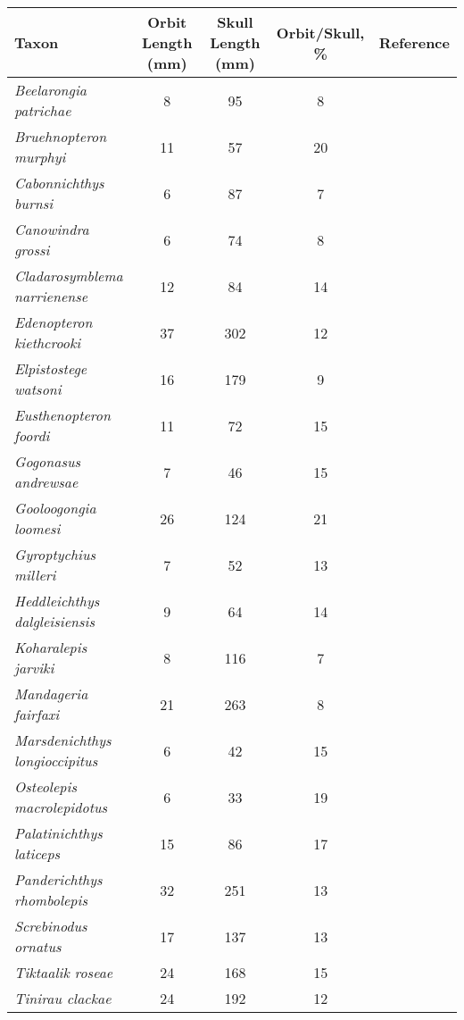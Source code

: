 \begin{tabular}{|L{4.5cm}|c|c|c|L{4.5cm}|}
\hline
\textbf{Taxon}&\textbf{Orbit Length (mm)}&\textbf{Skull Length (mm)}&\textbf{Orbit/Skull, \%}&\textbf{Reference}\\\hline
\textit{Beelarongia patrichae}&8&95&8&\citet{Long87a}\\\hline
\textit{Bruehnopteron  murphyi}&11&57&20&\citet{Schu12a}\\\hline
\textit{Cabonnichthys burnsi}&6&87&7&\citet{Ahlb97a}\\\hline
\textit{Canowindra grossi}&6&74&8&\citet{Long85a}\\\hline
\textit{Cladarosymblema narrienense}&12&84&14&\citet{Fox95a}\\\hline
\textit{Edenopteron kiethcrooki}&37&302&12&\citet{Youn13a}\\\hline
\textit{Elpistostege watsoni}&16&179&9&\citet{Schu85a}\\\hline
\textit{Eusthenopteron foordi}&11&72&15&\citet{Mark07a}\\\hline
\textit{Gogonasus andrewsae}&7&46&15&\citet{Long06a}\\\hline
\textit{Gooloogongia loomesi}&26&124&21&\citet{Joha98a}\\\hline
\textit{Gyroptychius  milleri}&7&52&13&\citet{Newm15a}\\\hline
\textit{Heddleichthys dalgleisiensis}&9&64&14&\citet{Snit09a}\\\hline
\textit{Koharalepis jarviki}&8&116&7&\citet{Youn92a}\\\hline
\textit{Mandageria fairfaxi}&21&263&8&\citet{Joha97a}\\\hline
\textit{Marsdenichthys longioccipitus}&6&42&15&\citet{Holl10a}\\\hline
\textit{Osteolepis macrolepidotus}&6&33&19&\citet{Jarv48a}\\\hline
\textit{Palatinichthys laticeps}&15&86&17&\citet{Witz12a}\\\hline
\textit{Panderichthys rhombolepis}&32&251&13&\citet{Voro91a}\\\hline
\textit{Screbinodus ornatus}&17&137&13&\citet{Jeff12a}\\\hline
\textit{Tiktaalik roseae}&24&168&15&\citet{Daes06a}\\\hline
\textit{Tinirau clackae}&24&192&12&\citet{Swar12a}\\\hline
\end{tabular}
